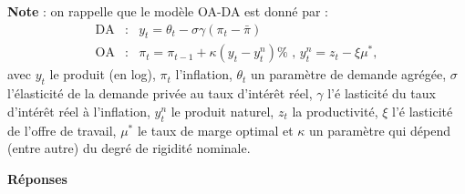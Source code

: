 \documentclass[a4paper,11pt]{article}
\begin{document}
\begin{center}
\bigskip
\end{center}

\textbf{Note} : on rappelle que le mod\`{e}le OA-DA est donn\'{e} par :%
\begin{eqnarray*}
\text{DA} &:&y_{t}=\theta _{t}-\sigma \gamma \left( \pi _{t}-\bar{\pi}%
\right)  \\
\text{OA} &:&\pi _{t}=\pi _{t-1}+\kappa \left( y_{t}-y_{t}^{n}\right) \text{%
, }y_{t}^{n}=z_{t}-\xi \mu ^{\ast },
\end{eqnarray*}%
avec $y_{t}$ le produit (en log), $\pi _{t}$ l'inflation, $\theta _{t}$ un
param\`{e}tre de demande agr\'{e}g\'{e}e, $\sigma $ l'\'{e}lasticit\'{e} de
la demande priv\'{e}e au taux d'int\'{e}r\^{e}t r\'{e}el, $\gamma $ l'\'{e}%
lasticit\'{e} du taux d'int\'{e}r\^{e}t r\'{e}el \`{a} l'inflation, $%
y_{t}^{n}$ le produit naturel, $z_{t}$ la productivit\'{e}, $\xi $ l'\'{e}%
lasticit\'{e} de l'offre de travail, $\mu ^{\ast }$ le taux de marge optimal
et $\kappa $ un param\`{e}tre qui d\'{e}pend (entre autre) du degr\'{e} de
rigidit\'{e} nominale.

\newpage

\textbf{R\'{e}ponses}

\bigskip
\end{document}
